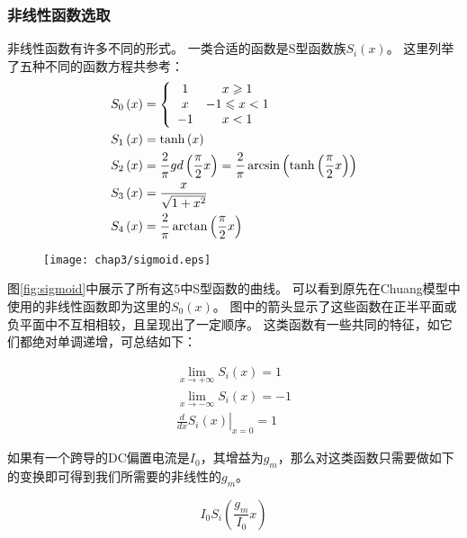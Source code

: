 \subsubsection{非线性函数选取}

非线性函数有许多不同的形式。
一类合适的函数是S型函数族$S_i\left(x\right)$。
这里列举了五种不同的函数方程共参考：
\begin{align}
&{S_0}\left( x \right) = \left\{ {\begin{array}{*{20}{c}}1 & {x \geqslant 1}  \\x & { - 1 \leqslant x < 1}  \\{ - 1} & {x < 1}  \\\end{array} } \right. \\
&{S_1}\left( x \right) = \tanh \left( x \right) \hfill \\
&{S_2}\left( x \right) = \frac{2}{\pi }gd\left( {\frac{\pi }	{2}x} \right) = \frac{2}{\pi }\arcsin \left( {\tanh \left( {\frac{\pi }{2}x} \right)} \right)\\
&{S_3}\left( x \right) = \frac{x}{{\sqrt {1 + {x^2}} }}\\
&{S_4}\left( x \right) = \frac{2}{\pi }\arctan \left( {\frac{\pi }{2}x} \right)
\end{align}

\begin{figure}[!htp]
	\centering
	\texttt{[image: chap3/sigmoid.eps]}
\end{figure}

图\ref{fig:sigmoid}中展示了所有这5中S型函数的曲线。
可以看到原先在Chuang模型中使用的非线性函数即为这里的$S_0\left(x\right)$。
图中的箭头显示了这些函数在正半平面或负平面中不互相相较，且呈现出了一定顺序。
这类函数有一些共同的特征，如它们都绝对单调递增，可总结如下：

\begin{eqnarray}
\mathop {\lim }\limits_{x \to  + \infty } {S_i}\left( x \right) = 1\\
\mathop {\lim }\limits_{x \to  - \infty } {S_i}\left( x \right) = -1\\
{\left. {\frac{d}{{dx}}{S_i}\left( x \right)} \right|_{x = 0}} = 1
\end{eqnarray}

如果有一个跨导的DC偏置电流是$I_0$，其增益为$g_m$，那么对这类函数只需要做如下的变换即可得到我们所需要的非线性的$g_m$。

\begin{equation}
{I_0}{S_i}\left( {\frac{{{g_m}}}{{{I_0}}}x} \right)
\end{equation}


